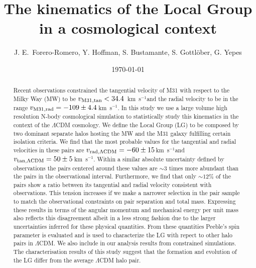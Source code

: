 \documentclass{emulateapj}
\newcommand{\kms}{\,km~s$^{-1}$}
\begin{document}
\title{The kinematics of the Local Group in a cosmological context}
\author{
J. E.\ Forero-Romero, 
Y. Hoffman, 
S. Bustamante, 
S. Gottl\"ober, 
G. Yepes
}


\date{\today}

\begin{abstract}
   
Recent observations constrained the tangential velocity of M31 with respect to the Milky Way (MW) to be $v_{\rm M31,tan}<34.4$ \kms and the radial velocity to be in the range $v_{\rm M31,rad}=-109\pm 4.4$\kms \citep{vanderMarel12}. In this study we use a large volume high resolution N-body cosmological simulation to statistically study this kinematics in the context of the $\Lambda$CDM cosmology. We define the Local Group (LG) to be composed by two dominant separate halos hosting the MW and the M31 galaxy fulfilling certain isolation criteria. We find that the most probable values for the tangential and radial velocities in these pairs are $v_{\rm rad, \Lambda CDM}=-60\pm 15$\kms and $v_{\rm tan, \Lambda CDM}=50\pm 5$\kms. Within a similar absolute uncertainty defined by observations the pairs centered around these values are $\sim3$ times more abundant than the pairs in the observational interval. Furthermore, we find that only $\sim12\%$ of the pairs show a ratio between its tangential and radial velocity consistent with observations. This tension increases if we make a narrower selection in the pair sample to match the observational constraints on pair separation and total mass. Expressing these results in terms of the angular momentum and mechanical energy per unit mass also reflects this disagreement albeit in a less strong fashion due to the larger uncertainties inferred for these physical quantities. From these quantities Peeble's spin parameter is evaluated and is used to characterize the LG with repect to other halo pairs in $\Lambda$CDM. We also include in our analysis results from constrained simulations. The characterisation results of this study suggest that the formation and evolution of the LG differ from the average $\Lambda$CDM halo pair.
\end{abstract}
\end{document}
